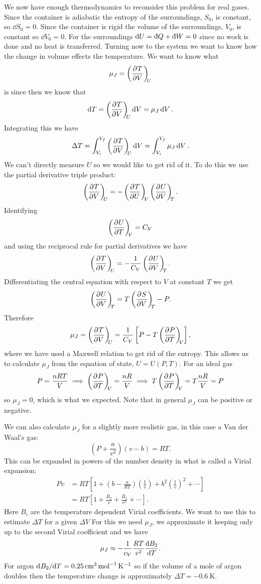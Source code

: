 \documentclass[a4paper]{article}
\newcommand{\ddbar}[1]{\text{\dj}{#1}}
\begin{document}
    We now have enough thermodynamics to reconsider this problem for real gases.
    Since the container is adiabatic the entropy of the surroundings, \(S_0\), is constant, so \(\dd{S_0} = 0\).
    Since the container is rigid the volume of the surroundings, \(V_0\), is constant so \(\dd{V_0} = 0\).
    For the surroundings \(\dd{U} = \ddbar{Q} + \ddbar{W} = 0\) since no work is done and no heat is transferred.
    Turning now to the system we want to know how the change in volume effects the temperature.
    We want to know what
    \[\mu_J = \left(\pdv[]{T}{V}\right)_{\!\!{U}}\]
    is since then we know that
    \[\dd{T} = \left(\pdv[]{T}{V}\right)_{\!\!{U}}\dd{V} = \mu_J\dd{V}.\]
    Integrating this we have
    \[\Delta T = \int_{V_i}^{V_f}\left(\pdv[]{T}{V}\right)_{\!\!{U}}\dd{V} = \int_{V_i}^{V_f}\mu_J\dd{V}.\]
    We can't directly measure \(U\) so we would like to get rid of it.
    To do this we use the partial derivative triple product:
    \[\left(\pdv[]{T}{V}\right)_{\!\!{U}} = -\left(\pdv[]{T}{U}\right)_{\!\!{V}}\left(\pdv[]{U}{V}\right)_{\!\!{T}}.\]
    Identifying
    \[\left(\pdv[]{U}{T}\right)_{\!\!{V}} = C_V\]
    and using the reciprocal rule for partial derivatives we have
    \[\left(\pdv[]{T}{V}\right)_{\!\!{U}} = -\frac{1}{C_V}\left(\pdv[]{U}{V}\right)_{\!\!{T}}.\]
    Differentiating the central equation with respect to \(V\) at constant \(T\) we get
    \[\left(\pdv[]{U}{V}\right)_{\!\!{T}} = T\left(\pdv[]{S}{V}\right)_{\!\!{T}} - P.\]
    Therefore
    \[\mu_J = \left(\pdv[]{T}{V}\right)_{\!\!{U}} = \frac{1}{C_V}\left[P - T\left(\pdv[]{P}{T}\right)_{\!\!{V}}\right],\]
    where we have used a Maxwell relation to get rid of the entropy.
    This allows us to calculate \(\mu_J\) from the equation of state, \(U = U(P, T)\).
    For an ideal gas
    \[P = \frac{nRT}{V} \implies \left(\pdv[]{P}{T}\right)_{\!\!{V}} = \frac{nR}{V} \implies T\left(\pdv[]{P}{T}\right)_{\!\!{V}} = T\frac{nR}{V} = P\]
    so \(\mu_J = 0\), which is what we expected.
    Note that in general \(\mu_J\) can be positive or negative.
    
    We can also calculate \(\mu_J\) for a slightly more realistic gas, in this case a Van der Waal's gas:
    \[\left(P + \frac{a}{v^2}\right)(v - b) = RT.\]
    This can be expanded in powers of the number density in what is called a Virial expansion:
    \begin{align*}
        Pv &= RT\left[1 + \left(b - \frac{a}{RT}\right)\left(\frac{1}{v}\right) + b^2\left(\frac{1}{v}\right)^2 + \dotsb\right]\\
        &= RT\left[1 + \frac{B_2}{v} + \frac{B_3}{v^2} + \dotsb\right].
    \end{align*}
    Here \(B_i\) are the temperature dependent Virial coefficients.
    We want to use this to estimate \(\Delta T\) for a given \(\Delta V\)
    For this we need \(\mu_J\), we approximate it keeping only up to the second Virial coefficient and we have
    \[\mu_J \approx -\frac{1}{c_V}\frac{RT}{v^2}\dv{B_2}{T}.\]
    For argon \(\mathrm{d}^{}{B_2}/\mathrm{d}{T}^{} = \SI{0.25}{\centi\metre^3.\mole^{-1}.\kelvin^{-1}}\) so if the volume of a mole of argon doubles then the temperature change is approximately \(\Delta T = \SI{-0.6}{\kelvin}\).
    
\end{document}
